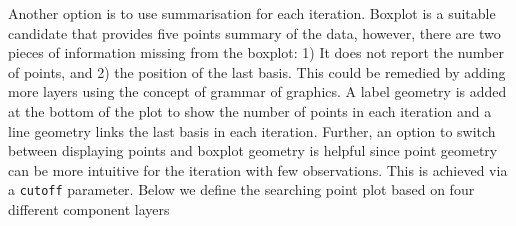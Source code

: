 \documentclass[12pt]{article}
\begin{document}
Another option is to use summarisation for each iteration. Boxplot is a
suitable candidate that provides five points summary of the data,
however, there are two pieces of information missing from the boxplot:
1) It does not report the number of points, and 2) the position of the
last basis. This could be remedied by adding more layers using the
concept of grammar of graphics. A label geometry is added at the bottom
of the plot to show the number of points in each iteration and a line
geometry links the last basis in each iteration. Further, an option to
switch between displaying points and boxplot geometry is helpful since
point geometry can be more intuitive for the iteration with few
observations. This is achieved via a \texttt{cutoff} parameter. Below we
define the searching point plot based on four different component layers
\end{document}
